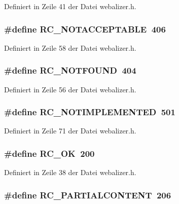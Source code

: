 Definiert in Zeile 41 der Datei webalizer.h.
\subsubsection{\setlength{\rightskip}{0pt plus 5cm}\#define RC\_\-NOTACCEPTABLE~406}\label{webalizer_8h_84e1c25114a994a902bcc647855ac889}




Definiert in Zeile 58 der Datei webalizer.h.
\subsubsection{\setlength{\rightskip}{0pt plus 5cm}\#define RC\_\-NOTFOUND~404}\label{webalizer_8h_71678208a421e84056782803d8a4b123}




Definiert in Zeile 56 der Datei webalizer.h.
\subsubsection{\setlength{\rightskip}{0pt plus 5cm}\#define RC\_\-NOTIMPLEMENTED~501}\label{webalizer_8h_ede48bc0a06917580753201049f9e396}




Definiert in Zeile 71 der Datei webalizer.h.
\subsubsection{\setlength{\rightskip}{0pt plus 5cm}\#define RC\_\-OK~200}\label{webalizer_8h_c96a9e3f6c17299d532eb572ef0ea415}




Definiert in Zeile 38 der Datei webalizer.h.
\subsubsection{\setlength{\rightskip}{0pt plus 5cm}\#define RC\_\-PARTIALCONTENT~206}\label{webalizer_8h_893e07be696874c598cea81950e6c072}




